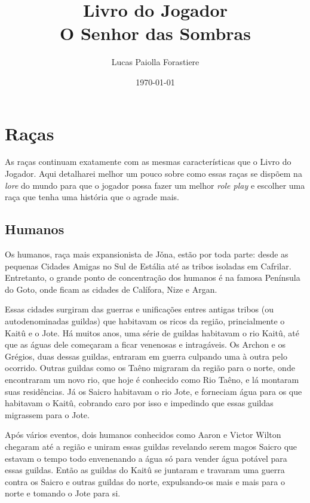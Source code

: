 \documentclass{RPG_Adventure}[2021/10/20]
\title{Livro do Jogador\\ \Huge{O Senhor das Sombras}}
\date{\today}
\author{Lucas Paiolla Forastiere}
\begin{document}
\maketitle
\tableofcontents
\newpage


\chapter{Raças}%
\label{cha:racas}
\begin{multicols}{2}

As raças continuam exatamente com as mesmas características que o Livro do
Jogador. Aqui detalharei melhor um pouco sobre como essas raças se dispõem na
\textit{lore} do mundo para que o jogador possa fazer um melhor \textit{role
play} e escolher uma raça que tenha uma história que o agrade mais.

\section{Humanos}%

Os humanos, raça mais expansionista de Jǒna, estão por toda parte: desde as
pequenas Cidades Amigas no Sul de Estália até as tribos isoladas em Cafrilar.
Entretanto, o grande ponto de concentração dos humanos é na famosa Península do
Goto, onde ficam as cidades de Calífora, Nize e Argan.

Essas cidades surgiram das guerras e unificações entres antigas tribos (ou
autodenominadas guildas) que habitavam os ricos da região, princialmente o
Kaitû e o Jote. Há muitos anos, uma série de guildas habitavam o rio Kaitû, até
que as águas dele começaram a ficar venenosas e intragáveis. Os Archon e os
Grégios, duas dessas guildas, entraram em guerra culpando uma à outra pelo
ocorrido. Outras guildas como os Taêno migraram da região para o norte, onde
encontraram um novo rio, que hoje é conhecido como Rio Taêno, e lá montaram suas
residências. Já os Saicro habitavam o rio Jote, e forneciam água para os que
habitavam o Kaitû, cobrando caro por isso e impedindo que essas guildas
migrassem para o Jote.

Após vários eventos, dois humanos conhecidos como Aaron e Victor Wilton chegaram
até a região e uniram essas guildas revelando serem magos Saicro que estavam o
tempo todo envenenando a água só para vender água potável para essas guildas.
Então as guildas do Kaitû se juntaram e travaram uma guerra contra os Saicro e
outras guildas do norte, expulsando-os mais e mais para o norte e tomando o Jote
para si.


\end{multicols}
\end{document}
